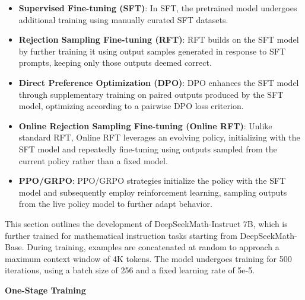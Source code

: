 \begin{itemize}
    \item  \textbf{Supervised Fine-tuning (SFT)}: In SFT, the pretrained model undergoes additional training using manually curated SFT datasets.
    \item \textbf{Rejection Sampling Fine-tuning (RFT)}: RFT builds on the SFT model by further training it using output samples generated in response to SFT prompts, keeping only those outputs deemed correct.
    \item \textbf{Direct Preference Optimization (DPO)}: DPO enhances the SFT model through supplementary training on paired outputs produced by the SFT model, optimizing according to a pairwise DPO loss criterion.
    \item \textbf{Online Rejection Sampling Fine-tuning (Online RFT)}: Unlike standard RFT, Online RFT leverages an evolving policy, initializing with the SFT model and repeatedly fine-tuning using outputs sampled from the current policy rather than a fixed model.
    \item \textbf{PPO/GRPO}: PPO/GRPO strategies initialize the policy with the SFT model and subsequently employ reinforcement learning, sampling outputs from the live policy model to further adapt behavior.
\end{itemize}

This section outlines the development of DeepSeekMath-Instruct 7B, which is further trained for mathematical instruction tasks starting from DeepSeekMath-Base. During training, examples are concatenated at random to approach a maximum context window of 4K tokens. The model undergoes training for 500 iterations, using a batch size of 256 and a fixed learning rate of 5e-5.

\textbf{One-Stage Training}


\begin{abstract}
The intricacies and structured patterns inherent in mathematical reasoning present a formidable obstacle for language models. Here, we present DeepSeekMath~7B, which builds upon DeepSeek-Coder-Base-v1.5 7B by conducting additional pre-training on 120B mathematics-specific tokens collected from Common Crawl, complemented by data from natural language and programming code sources. DeepSeekMath~7B demonstrates strong results, attaining a 51.7\% score on the highly challenging MATH benchmark—achieved without the assistance of supplementary toolkits or voting strategies—narrowing the gap with state-of-the-art models such as Gemini-Ultra and GPT-4. When employing self-consistency with 64 sampled completions, DeepSeekMath~7B reaches 60.9\% accuracy on MATH. The model’s proficiency in mathematical reasoning is largely credited to two main elements: Firstly, the robust exploitation of freely available internet data, achieved through a carefully developed data selection pipeline. Secondly, the proposal of Group Relative Policy Optimization (GRPO), an extension of Proximal Policy Optimization (PPO), which strengthens the model’s mathematical reasoning skills and, at the same time, leads to more efficient memory utilization during PPO.
\end{abstract}

